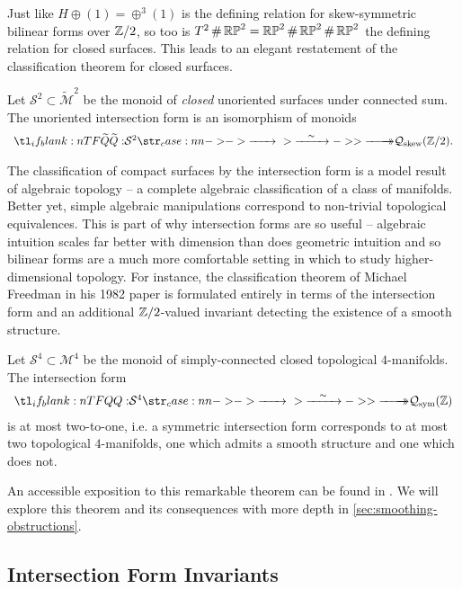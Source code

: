 Just like $H\oplus (1)= \oplus^3 (1)$ is the defining relation for skew-symmetric bilinear forms over $\mathbb{Z}/2$, so too is $T^2\,\#\, \mathbb{RP}^2 = \mathbb{RP}^2\,\#\,\mathbb{RP}^2\,\#\,\mathbb{RP}^2$ the defining relation for closed surfaces. This leads to an elegant restatement of the classification theorem for closed surfaces.

\begin{theorem}
	Let $\mathcal{S}^2\subset \widetilde{\mathcal{M}}^2$ be the monoid of \textit{closed} unoriented surfaces under connected sum. The unoriented intersection form is an isomorphism of monoids
	\[
		\lkxfunc{\widetilde{Q}}{\mathcal{S}^2}{\mathcal{Q}_{\mathrm{skew}}(\Z/2).}
	\]
\end{theorem}

The classification of compact surfaces by the intersection form is a model result of algebraic topology -- a complete algebraic classification of a class of manifolds. Better yet, simple algebraic manipulations correspond to non-trivial topological equivalences. This is part of why intersection forms are so useful -- algebraic intuition scales far better with dimension than does geometric intuition and so bilinear forms are a much more comfortable setting in which to study higher-dimensional topology. For instance, the classification theorem of Michael Freedman in his 1982 paper \cite{freedman1982manifold} is formulated entirely in terms of the intersection form and an additional $\mathbb{Z}/2$-valued invariant detecting the existence of a smooth structure.

\begin{theorem}[Freedman, 1982] Let $\mathcal{S}^4\subset \mathcal{M}^4$ be the monoid of simply-connected closed topological $4$-manifolds. The intersection form
	\[
		\lkxfunc{Q}{\mathcal{S}^4}{\mathcal{Q}_{\mathrm{sym}}(\Z)}
	\]
	is at most two-to-one, i.e. a symmetric intersection form corresponds to at most two topological $4$-manifolds, one which admits a smooth structure and one which does not.
\end{theorem}
An accessible exposition to this remarkable theorem can be found in \cite{behrens2021discembedding}. We will explore this theorem and its consequences with more depth in \cref{sec:smoothing-obstructions}.


\subsection{Intersection Form Invariants}\label{sec:intersection-form-invariants}

